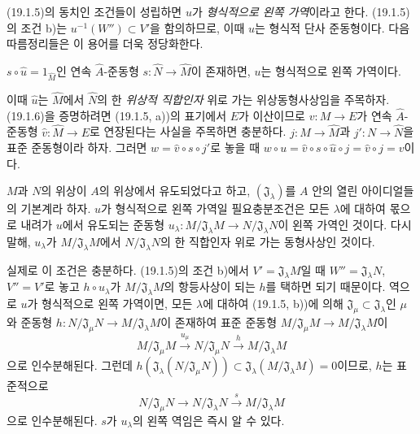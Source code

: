 (19.1.5)의 동치인 조건들이 성립하면 $u$가
\emph{형식적으로 왼쪽 가역}이라고 한다. (19.1.5)의 조건 b)는
$u^{-1}(W'')\subset V'$을 함의하므로, 이때 $u$는 형식적 단사
준동형이다. 다음 따름정리들은 이 용어를 더욱 정당화한다.

\begin{corollary}[19.1.6]
\label{0.19.1.6-fr}
$s\circ\widehat u=1_{\widehat M}$인 연속 $\widehat A$-준동형
$s:\widehat N\to\widehat M$이 존재하면, $u$는 형식적으로 왼쪽
가역이다.
\end{corollary}

이때 $\widehat u$는 $\widehat M$에서 $\widehat N$의 한
\emph{위상적 직합인자} 위로 가는 위상동형사상임을 주목하자.
(19.1.6)을 증명하려면 (19.1.5, a))의 표기에서 $E$가 이산이므로
$v:M\to E$가 연속 $\widehat A$-준동형
$\widehat v:\widehat M\to E$로 연장된다는 사실을 주목하면
충분하다. $j:M\to\widehat M$과 $j':N\to\widehat N$을 표준
준동형이라 하자. 그러면
$w=\widehat v\circ s\circ j'$로 놓을 때
$w\circ u=\widehat v\circ s\circ\widehat u\circ j
=\widehat v\circ j=v$이다.

\begin{corollary}[19.1.7]
\label{0.19.1.7-fr}
$M$과 $N$의 위상이 $A$의 위상에서 유도되었다고 하고,
$(\mathfrak J_\lambda)$를 $A$ 안의 열린 아이디얼들의 기본계라 하자.
$u$가 형식적으로 왼쪽 가역일 필요충분조건은 모든 $\lambda$에
대하여 몫으로 내려가 $u$에서 유도되는 준동형
$u_\lambda:M/\mathfrak J_\lambda M\to N/\mathfrak J_\lambda N$이
왼쪽 가역인 것이다. 다시 말해, $u_\lambda$가
$M/\mathfrak J_\lambda M$에서 $N/\mathfrak J_\lambda N$의 한
직합인자 위로 가는 동형사상인 것이다.
\end{corollary}

실제로 이 조건은 충분하다. (19.1.5)의 조건 b)에서
$V'=\mathfrak J_\lambda M$일 때
$W''=\mathfrak J_\lambda N$, $V''=V'$로 놓고
$h\circ u_\lambda$가 $M/\mathfrak J_\lambda M$의 항등사상이 되는
$h$를 택하면 되기 때문이다. 역으로 $u$가 형식적으로 왼쪽
가역이면, 모든 $\lambda$에 대하여 (19.1.5, b))에 의해
$\mathfrak J_\mu\subset\mathfrak J_\lambda$인 $\mu$와 준동형
$h:N/\mathfrak J_\mu N\to M/\mathfrak J_\lambda M$이 존재하여 표준
준동형 $M/\mathfrak J_\mu M\to M/\mathfrak J_\lambda M$이
\[
  M/\mathfrak J_\mu M\xrightarrow{u_\mu}N/\mathfrak J_\mu N
  \xrightarrow{h}M/\mathfrak J_\lambda M
\]
으로 인수분해된다. 그런데
$h(\mathfrak J_\lambda(N/\mathfrak J_\mu N))
\subset\mathfrak J_\lambda(M/\mathfrak J_\lambda M)=0$이므로,
$h$는 표준적으로
\[
  N/\mathfrak J_\mu N\longrightarrow N/\mathfrak J_\lambda N
  \xrightarrow{s}M/\mathfrak J_\lambda M
\]
으로 인수분해된다. $s$가 $u_\lambda$의 왼쪽 역임은 즉시 알 수 있다.


